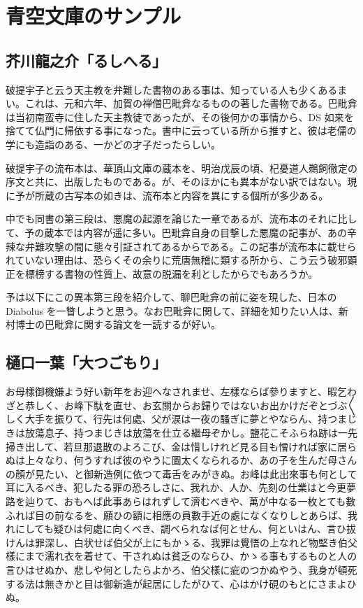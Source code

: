 \documentclass{utbook}
\begin{document}
\chapter{青空文庫のサンプル}
\section{芥川龍之介「るしへる」}

破提宇子と云う天主教を弁難した書物のある事は、知っている人も少くあるまい。これは、元和六年、加賀の禅僧巴毗弇なるものの著した書物である。巴毗弇は当初南蛮寺に住した天主教徒であったが、その後何かの事情から、DS 如来を捨てて仏門に帰依する事になった。書中に云っている所から推すと、彼は老儒の学にも造詣のある、一かどの才子だったらしい。

破提宇子の流布本は、華頂山文庫の蔵本を、明治戊辰の頃、杞憂道人鵜飼徹定の序文と共に、出版したものである。が、そのほかにも異本がない訳ではない。現に予が所蔵の古写本の如きは、流布本と内容を異にする個所が多少ある。

中でも同書の第三段は、悪魔の起源を論じた一章であるが、流布本のそれに比して、予の蔵本では内容が遥に多い。巴毗弇自身の目撃した悪魔の記事が、あの辛辣な弁難攻撃の間に態々引証されてあるからである。この記事が流布本に載せられていない理由は、恐らくその余りに荒唐無稽に類する所から、こう云う破邪顕正を標榜する書物の性質上、故意の脱漏を利としたからでもあろうか。

予は以下にこの異本第三段を紹介して、聊巴毗弇の前に姿を現した、日本の Diabolus を一瞥しようと思う。なお巴毗弇に関して、詳細を知りたい人は、新村博士の巴毗弇に関する論文を一読するが好い。


\section{樋口一葉「大つごもり」}

お母樣御機嫌よう好い新年をお迎へなされませ、左樣ならば參りますと、暇乞わざと恭しく、お峰下駄を直せ、お玄關からお歸りではないお出かけだぞとづぶ〳〵しく大手を振りて、行先は何處、父が涙は一夜の騷ぎに夢とやならん、持つまじきは放蕩息子、持つまじきは放蕩を仕立る繼母ぞかし。鹽花こそふらね跡は一先掃き出して、若旦那退散のよろこび、金は惜しけれど見る目も憎ければ家に居らぬは上々なり、何うすれば彼のやうに圖太くなられるか、あの子を生んだ母さんの顏が見たい、と御新造例に依つて毒舌をみがきぬ。お峰は此出來事も何として耳に入るべき、犯したる罪の恐ろしさに、我れか、人か、先刻の仕業はと今更夢路を辿りて、おもへば此事あらはれずして濟むべきや、萬が中なる一枚とても數ふれば目の前なるを、願ひの額に相應の員數手近の處になくなりしとあらば、我れにしても疑ひは何處に向くべき、調べられなば何とせん、何といはん、言ひ拔けんは罪深し、白状せば伯父が上にもかゝる、我罪は覺悟の上なれど物堅き伯父樣にまで濡れ衣を着せて、干されぬは貧乏のならひ、かゝる事もするものと人の言ひはせぬか、悲しや何としたらよかろ、伯父樣に疵のつかぬやう、我身が頓死する法は無きかと目は御新造が起居にしたがひて、心はかけ硯のもとにさまよひぬ。
\end{document}
